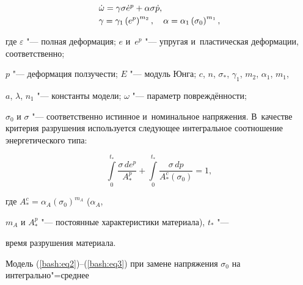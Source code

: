 \begin{equation}
\begin{array}{l}
\dot {\omega } = \gamma \sigma \dot {e}^p + \alpha \sigma \dot {p},

\vspace{1mm}

\\

\displaystyle 

\gamma = \gamma _1 \left( {e^p} \right)^{m_2 },

\quad

\alpha = \alpha _1 \left( {\sigma _0 } \right)^{m_1 },

\end{array}

\end{equation}

где $\varepsilon $ "--- полная деформация; $e$ и~$e^p$ "--- упругая и~пластическая деформации, соответственно; 

$p$ "--- деформация ползучести; $E$ "--- модуль Юнга; $c$, $n$, $\sigma_* $, $\gamma_1 $, $m_2 $, $\alpha _1$, $m_1$, 

$a$, $\lambda$, $n_1 $ "--- константы модели; $\omega $ "--- параметр повреждённости;

$\sigma _0 $ и $\sigma $ "--- соответственно истинное и~номинальное напряжения. В~качестве критерия разрушения используется следующее интегральное соотношение энергетического типа:



\vspace{-2mm}

\begin{equation}

\label{bash:eq3}

\int\limits_0^{t_*} {\frac{\sigma \,de^p}{A_*^p }} + \int\limits_0^{t_*} 

\frac{\sigma \,dp}{A_*^c \left( {\sigma_0 } \right)} = 1,

\end{equation}

\vspace{-2mm}



\noindent

где $A_*^c = \alpha _A \left( {\sigma _0 } \right)^{m_A }$ ($\alpha _A $, 

$m_A $ и $A_ * ^p $ "--- постоянные характеристики материала), $t_*$ "---

время разрушения материала.



Модель (\ref{bash:eq2})--(\ref{bash:eq3}) при замене напряжения $\sigma _0 $ на интегрально"=среднее 

